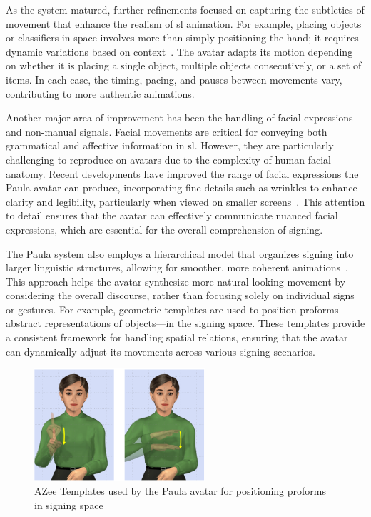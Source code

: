 \documentclass[../../main.tex]{subfiles}
\begin{document}
As the system matured, further refinements focused on capturing the subtleties of movement that enhance the realism of \gls{sl} animation. For example, placing objects or classifiers in space involves more than simply positioning the hand; it requires dynamic variations based on context~\cite{mcdonald2019fine}. The avatar adapts its motion depending on whether it is placing a single object, multiple objects consecutively, or a set of items. In each case, the timing, pacing, and pauses between movements vary, contributing to more authentic animations.

Another major area of improvement has been the handling of facial expressions and non-manual signals. Facial movements are critical for conveying both grammatical and affective information in \gls{sl}. However, they are particularly challenging to reproduce on avatars due to the complexity of human facial anatomy. Recent developments have improved the range of facial expressions the Paula avatar can produce, incorporating fine details such as wrinkles to enhance clarity and legibility, particularly when viewed on smaller screens~\cite{johnson2021towards}. This attention to detail ensures that the avatar can effectively communicate nuanced facial expressions, which are essential for the overall comprehension of signing.

The Paula system also employs a hierarchical model that organizes signing into larger linguistic structures, allowing for smoother, more coherent animations~\cite{filhol2018extending}. This approach helps the avatar synthesize more natural-looking movement by considering the overall discourse, rather than focusing solely on individual signs or gestures. For example, geometric templates are used to position proforms—abstract representations of objects—in the signing space. These templates provide a consistent framework for handling spatial relations, ensuring that the avatar can dynamically adjust its movements across various signing scenarios.

\begin{figure}
    \centering \includegraphics[width = 2.5in]{chapters/intermediate_blocks/images/azee_template_example.png}
    \caption{AZee Templates used by the Paula avatar for positioning proforms in signing space}
    \label{fig:azee_geo_template_example}
\end{figure}
\end{document}
